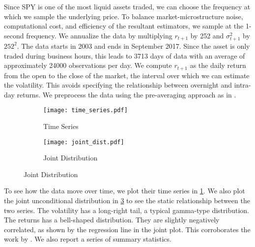 Since SPY is one of the most liquid assets traded, we can choose the frequency at which we sample the underlying price. To balance market-microstructure noise, computational cost, and efficiency of the resultant estimators, we sample at the \num{1}-second frequency. We annualize the data by multiplying $r_{t+1}$ by \num{252} and $\sigma^2_{t+1}$ by $252^2$. The data starts in 2003 and ends in September 2017. Since the asset is only traded during business hours, this leads to \num{3713} days of data with an average of approximately \num{24000} observations per day. We compute $r_{t+1}$ as the daily return from the open to the close of the market, the interval over which we can estimate the volatility. This avoids specifying the relationship between overnight and intra-day returns. We preprocess the data using the pre-averaging approach as in \textcites{podolskij2009bipower, aitsahalia2012testing}. 


\begin{figure}[htb]

  \centering
  \caption{S\&P 500 Volatility and Log-Return}


  \begin{subfigure}[t]{.54\textwidth}
    \label{risk_fig:spy_dynamics}
    \caption{Time Series}
    \texttt{[image: time\_series.pdf]}
  \end{subfigure}%
%
  \hfill
%
  \begin{subfigure}[t]{.44\textwidth}
    \label{risk_fig:spy_static}
    \caption{Joint Distribution}
    \texttt{[image: joint\_dist.pdf]}
  \end{subfigure}
\end{figure}


To see how the data move over time, we plot their time series in  \cref{risk_fig:spy_dynamics}.  We also plot the joint unconditional distribution in \cref{risk_fig:spy_static} to see the static relationship between the two series. The volatility has a long-right tail, a typical gamma-type distribution. The returns has a bell-shaped distribution. They are slightly negatively correlated, as shown by the regression line in the joint plot. This corroborates the work by \textcites{bandi2012timevarying, aitsahalia2013leverage}. We also report a series of summary statistics.

